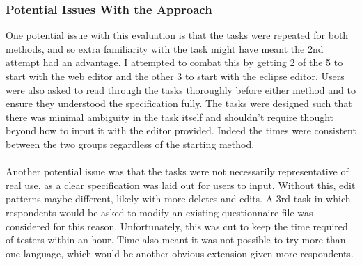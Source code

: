 \documentclass{article}
\begin{document}
{%

% 




\subsubsection{Potential Issues With the Approach}
One potential issue with this evaluation is that the tasks were repeated for both methods, and so extra familiarity with the task might have meant the 2nd attempt had an advantage. I attempted to combat this by getting 2 of the 5 to start with the web editor and the other 3 to start with the eclipse editor. Users were also asked to read through the tasks thoroughly before either method and to ensure they understood the specification fully. The tasks were designed such that there was minimal ambiguity in the task itself and shouldn't require thought beyond how to input it with the editor provided. Indeed the times were consistent between the two groups regardless of the starting method.
\\
\\
Another potential issue was that the tasks were not necessarily representative of real use, as a clear specification was laid out for users to input. Without this, edit patterns maybe different, likely with more deletes and edits. A 3rd task in which respondents would be asked to modify an existing questionnaire file was considered for this reason. Unfortunately, this was cut to keep the time required of testers within an hour. Time also meant it was not possible to try more than one language, which would be another obvious extension given more respondents.
}
\end{document}
